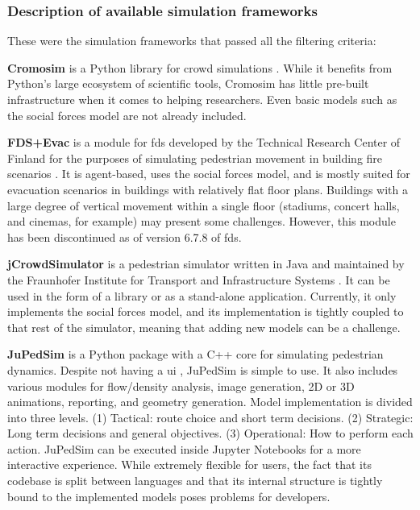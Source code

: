 \documentclass[twoside, 11pt]{article}
\begin{document}
\subsubsection{Description of available simulation frameworks}

These were the simulation frameworks that passed all the filtering criteria:

\textbf{Cromosim} is a Python library for crowd simulations \cite{cromosim}. While it benefits from Python's large ecosystem of scientific tools, Cromosim has little pre-built infrastructure when it comes to helping researchers. Even basic models such as the social forces model are not already included.

\textbf{FDS+Evac} is a module for \gls{fds} developed by the Technical Research Center of Finland for the purposes of simulating pedestrian movement in building fire scenarios \cite{korhonenFireDynamicsSimulator2009}. It is agent-based, uses the social forces model, and is mostly suited for evacuation scenarios in buildings with relatively flat floor plans. Buildings with a large degree of vertical movement within a single floor (stadiums, concert halls, and cinemas, for example) may present some challenges. However, this module has been discontinued as of version 6.7.8 of \gls{fds}.

\textbf{jCrowdSimulator} is a pedestrian simulator written in Java and maintained by the Fraunhofer Institute for Transport and Infrastructure Systems \cite{meinert2019simulation}. It can be used in the form of a library or as a stand-alone application. Currently, it only implements the social forces model, and its implementation is tightly coupled to that rest of the simulator, meaning that adding new models can be a challenge.

\textbf{JuPedSim} is a Python package with a C++ core for simulating pedestrian dynamics. Despite not having a \gls{ui} \cite{kemlohwagoumJuPedSimOpenFramework2015}, JuPedSim is simple to use. It also includes various modules for flow/density analysis, image generation, 2D or 3D animations, reporting, and geometry generation. Model implementation is divided into three levels. (1) Tactical: route choice and short term decisions. (2) Strategic: Long term decisions and general objectives. (3) Operational: How to perform each action. JuPedSim can be executed inside Jupyter Notebooks for a more interactive experience. While extremely flexible for users, the fact that its codebase is split between languages and that its internal structure is tightly bound to the implemented models poses problems for developers.
\end{document}
